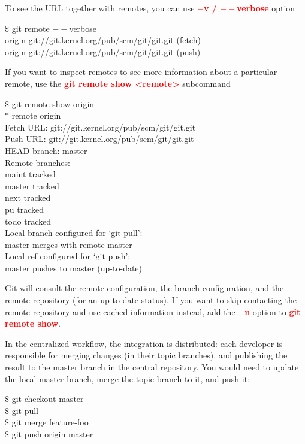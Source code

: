 \documentclass[12pt,a4paper]{article}
\begin{document}
To see the URL together with remotes, you can use \textcolor{red}{\bf $-$v / $--$verbose} option
\begin{tcolorbox}[colback=green!5,colframe=green!40!black,title= ]
$\$$ git remote $--$verbose \\
origin git://git.kernel.org/pub/scm/git/git.git (fetch) \\
origin git://git.kernel.org/pub/scm/git/git.git (push)
\end{tcolorbox}

If you want to inspect remotes to see more information about a particular remote, use the \textcolor{red}{\bf git remote show <remote>} subcommand
\begin{tcolorbox}[colback=green!5,colframe=green!40!black,title= ]
$\$$ git remote show origin \\
$\ast$ remote origin \\
Fetch URL: git://git.kernel.org/pub/scm/git/git.git \\
Push URL: git://git.kernel.org/pub/scm/git/git.git \\
HEAD branch: master \\
Remote branches: \\
maint tracked \\
master tracked \\
next tracked \\
pu tracked \\
todo tracked \\
Local branch configured for `git pull': \\
master merges with remote master \\
Local ref configured for `git push': \\
master pushes to master (up-to-date)
\end{tcolorbox}

Git will consult the remote configuration, the branch configuration, and the remote repository (for an up-to-date status). If you want to skip contacting the remote repository and use cached information instead, add the \textcolor{red}{\bf $-$n} option to \textcolor{red}{\bf git remote show}.




In the centralized workflow, the integration is distributed: each developer is responsible for merging changes (in their topic branches), and publishing the result to the master branch in the central repository. You would need to update the local master branch, merge the topic branch to it, and push it:
\begin{tcolorbox}[colback=green!5,colframe=green!40!black,title= ]
$\$$ git checkout master \\
$\$$ git pull \\
$\$$ git merge feature-foo \\
$\$$ git push origin master
\end{tcolorbox}
\end{document}
